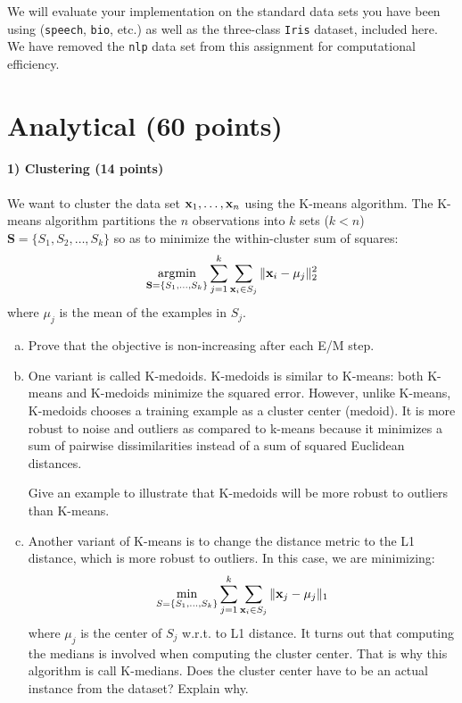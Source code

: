 \documentclass[11pt]{article}
\newcommand{\vx}{{\bf x}}
\newcommand{\vxi}{{\bf x}_i}
\newcommand{\code}[1]{{\footnotesize \tt #1}}
\begin{document}
We will evaluate your implementation on the standard data sets you have been using (\code{speech}, \code{bio}, etc.) as well as the three-class \code{Iris} dataset, included here.  We have removed the \code{nlp} data set from this assignment for computational efficiency.	
	
\section{Analytical (60 points)}
	
\paragraph{1) Clustering (14 points)}
	
We want to cluster the data set $\vx_1,\ldots,\vx_n$ using the K-means algorithm. The K-means algorithm partitions the $n$ observations into $k$ sets ($k < n$) $\mathbf{S} = \{S_1, S_2, \ldots, S_k\}$ so as to minimize the within-cluster sum of squares:
\begin{eqnarray*}
\mathop{\textrm{argmin}}_{\mathbf{S}=\{S_1,\ldots,S_k\}}\sum_{j=1}^k\sum_{\vxi\in S_j}\|\vx_i-\mu_j\|_2^2
\end{eqnarray*}
where $\mu_j$ is the mean of the examples in $S_j$.

\begin{enumerate}[(a)]
\item Prove that the objective is non-increasing after each E/M step.
\item One variant is called K-medoids. K-medoids is similar to K-means: both K-means and K-medoids minimize the squared error. However, unlike K-means, K-medoids chooses a training example as a cluster center (medoid). It is more robust to noise and outliers as compared to k-means because it minimizes a sum of pairwise dissimilarities instead of a sum of squared Euclidean distances. 

Give an example to illustrate that K-medoids will be more robust to outliers than K-means.
\item Another variant of K-means is to change the distance metric to the L1 distance, which is more robust to outliers. In this case, we are minimizing:
\begin{align}
\min_{S=\{S_1,...,S_k\}}\sum_{j=1}^k\sum_{\vxi\in S_j}\|\vx_j-\mu_j\|_1
\end{align}
where $\mu_j$ is the center of $S_j$ w.r.t. to L1 distance. It turns out that computing the medians is involved when computing the cluster center. That is why this algorithm is call K-medians. Does the cluster center have to be an actual instance from the dataset? Explain why.
\end{enumerate}
	
\end{document}
